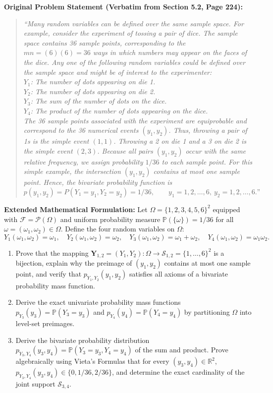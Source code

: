 \documentclass[11pt, letterpaper]{article}
\theoremstyle{definition}
\theoremstyle{remark}
\newcommand{\R}{\mathbb{R}}
\newcommand{\Prob}{\mathbb{P}}
\newcommand{\F}{\mathcal{F}}
\begin{document}
\textbf{Original Problem Statement (Verbatim from Section 5.2, Page 224):}
\begin{quote}
\emph{``Many random variables can be defined over the same sample space. For example, consider the experiment of tossing a pair of dice. The sample space contains 36 sample points, corresponding to the $mn = (6)(6) = 36$ ways in which numbers may appear on the faces of the dice. Any one of the following random variables could be defined over the sample space and might be of interest to the experimenter:\\
$Y_1$: The number of dots appearing on die 1.\\
$Y_2$: The number of dots appearing on die 2.\\
$Y_3$: The sum of the number of dots on the dice.\\
$Y_4$: The product of the number of dots appearing on the dice.\\
The 36 sample points associated with the experiment are equiprobable and correspond to the 36 numerical events $(y_1, y_2)$. Thus, throwing a pair of 1s is the simple event $(1, 1)$. Throwing a 2 on die 1 and a 3 on die 2 is the simple event $(2, 3)$. Because all pairs $(y_1, y_2)$ occur with the same relative frequency, we assign probability $1/36$ to each sample point. For this simple example, the intersection $(y_1, y_2)$ contains at most one sample point. Hence, the bivariate probability function is
\[
p(y_1, y_2) = P(Y_1 = y_1, Y_2 = y_2) = 1/36, \qquad y_1 = 1, 2, \dots, 6,\ y_2 = 1, 2, \dots, 6.\text{''}
\]}
\end{quote}

\textbf{Extended Mathematical Formulation:}
Let $\Omega = \{1, 2, 3, 4, 5, 6\}^2$ equipped with $\F = \mathcal{P}(\Omega)$ and uniform probability measure $\Prob(\{\omega\}) = 1/36$ for all $\omega = (\omega_1, \omega_2) \in \Omega$. Define the four random variables on $\Omega$:
\[
Y_1(\omega_1, \omega_2) = \omega_1, \quad Y_2(\omega_1, \omega_2) = \omega_2, \quad Y_3(\omega_1, \omega_2) = \omega_1 + \omega_2, \quad Y_4(\omega_1, \omega_2) = \omega_1 \omega_2.
\]
\begin{enumerate}[label=(\alph*)]
    \item Prove that the mapping $\mathbf{Y}_{1,2} = (Y_1, Y_2) : \Omega \to \mathcal{S}_{1,2} = \{1, \dots, 6\}^2$ is a bijection, explain why the preimage of $(y_1, y_2)$ contains at most one sample point, and verify that $p_{Y_1, Y_2}(y_1, y_2)$ satisfies all axioms of a bivariate probability mass function.
    \item Derive the exact univariate probability mass functions $p_{Y_3}(y_3) = \Prob(Y_3 = y_3)$ and $p_{Y_4}(y_4) = \Prob(Y_4 = y_4)$ by partitioning $\Omega$ into level-set preimages.
    \item Derive the bivariate probability distribution $p_{Y_3, Y_4}(y_3, y_4) = \Prob(Y_3 = y_3, Y_4 = y_4)$ of the sum and product. Prove algebraically using Vieta's Formulas that for every $(y_3, y_4) \in \R^2$, $p_{Y_3, Y_4}(y_3, y_4) \in \{0, 1/36, 2/36\}$, and determine the exact cardinality of the joint support $\mathcal{S}_{3,4}$.
\end{enumerate}
\end{document}
